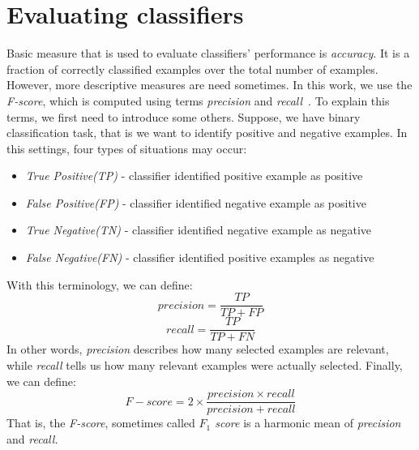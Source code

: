 \section{Evaluating classifiers}
Basic measure that is used to evaluate classifiers' performance is \textit{accuracy}.
It is a fraction of correctly classified examples over the total number of examples.
However, more descriptive measures are need sometimes.
In this work, we use the \textit{F-score}, which is computed using terms \textit{precision} and \textit{recall}~\cite{sokolova2006beyond}.
To explain this terms, we first need to introduce some others.
Suppose, we have binary classification task, that is we want to identify positive and negative examples.
In this settings, four types of situations may occur:
\begin{itemize}
\item \textit{True Positive(TP)} - classifier identified positive example as positive
\item \textit{False Positive(FP)} - classifier identified negative example as positive
\item \textit{True Negative(TN)} - classifier identified negative example as negative
\item \textit{False Negative(FN)} - classifier identified positive examples as negative
\end{itemize}
\par
With this terminology, we can define:
\begin{equation}
precision = \frac{TP}{TP + FP}
\end{equation}
\begin{equation}
recall = \frac{TP}{TP + FN}
\end{equation}
In other words, \textit{precision} describes how many selected examples are relevant, while \textit{recall} tells us how many relevant examples were actually selected.
Finally, we can define:
\begin{equation}
F-score = 2 \times \frac{precision \times recall}{precision + recall}
\end{equation}
That is, the \textit{F-score}, sometimes called \textit{$F_1$ score} is a harmonic mean of \textit{precision} and \textit{recall.}